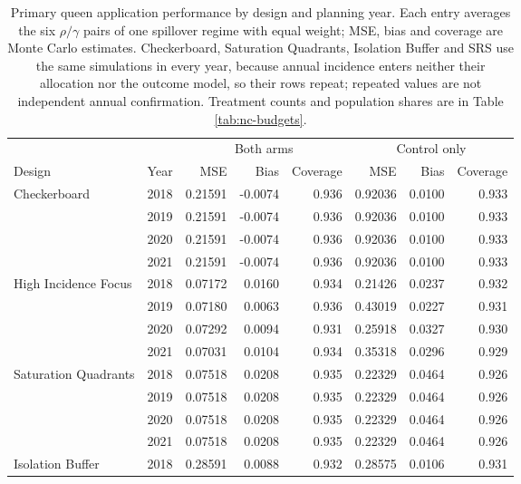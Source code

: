 \documentclass[11pt]{article}
\begin{document}
\begin{table}[!htb]
\footnotesize
\centering

\caption{Primary queen application performance by design and planning year. Each entry averages the six $\rho/\gamma$ pairs of one spillover regime with equal weight; MSE, bias and coverage are Monte Carlo estimates. Checkerboard, Saturation Quadrants, Isolation Buffer and SRS use the same simulations in every year, because annual incidence enters neither their allocation nor the outcome model, so their rows repeat; repeated values are not independent annual confirmation. Treatment counts and population shares are in Table \ref{tab:nc-budgets}.}
\label{tab:nc-annual}

\begin{tabular}{llrrrrrr}
\toprule
& & \multicolumn{3}{c}{Both arms} & \multicolumn{3}{c}{Control only} \\
\cmidrule(lr){3-5}\cmidrule(lr){6-8}
Design & Year & MSE & Bias & Coverage & MSE & Bias & Coverage \\
\midrule
Checkerboard & 2018 & 0.21591 & -0.0074 & 0.936 & 0.92036 & 0.0100 & 0.933 \\
 & 2019 & 0.21591 & -0.0074 & 0.936 & 0.92036 & 0.0100 & 0.933 \\
 & 2020 & 0.21591 & -0.0074 & 0.936 & 0.92036 & 0.0100 & 0.933 \\
 & 2021 & 0.21591 & -0.0074 & 0.936 & 0.92036 & 0.0100 & 0.933 \\
\addlinespace
High Incidence Focus & 2018 & 0.07172 & 0.0160 & 0.934 & 0.21426 & 0.0237 & 0.932 \\
 & 2019 & 0.07180 & 0.0063 & 0.936 & 0.43019 & 0.0227 & 0.931 \\
 & 2020 & 0.07292 & 0.0094 & 0.931 & 0.25918 & 0.0327 & 0.930 \\
 & 2021 & 0.07031 & 0.0104 & 0.934 & 0.35318 & 0.0296 & 0.929 \\
\addlinespace
Saturation Quadrants & 2018 & 0.07518 & 0.0208 & 0.935 & 0.22329 & 0.0464 & 0.926 \\
 & 2019 & 0.07518 & 0.0208 & 0.935 & 0.22329 & 0.0464 & 0.926 \\
 & 2020 & 0.07518 & 0.0208 & 0.935 & 0.22329 & 0.0464 & 0.926 \\
 & 2021 & 0.07518 & 0.0208 & 0.935 & 0.22329 & 0.0464 & 0.926 \\
\addlinespace
Isolation Buffer & 2018 & 0.28591 & 0.0088 & 0.932 & 0.28575 & 0.0106 & 0.931 \\

\end{tabular}
\end{table}
\end{document}
